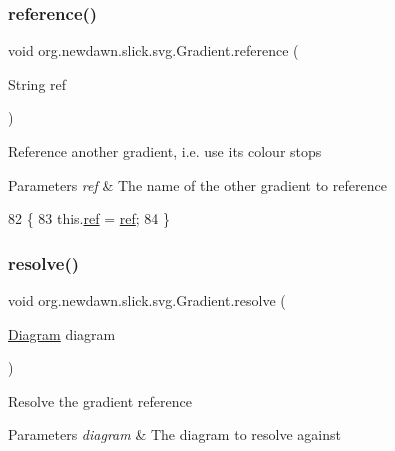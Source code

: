 \subsubsection{\texorpdfstring{reference()}{reference()}}
{\footnotesize\ttfamily void org.\+newdawn.\+slick.\+svg.\+Gradient.\+reference (\begin{DoxyParamCaption}\item[{String}]{ref }\end{DoxyParamCaption})\hspace{0.3cm}{\ttfamily [inline]}}

Reference another gradient, i.\+e. use it\textquotesingle{}s colour stops


\begin{DoxyParams}{Parameters}
{\em ref} & The name of the other gradient to reference \\
\hline
\end{DoxyParams}

\begin{DoxyCode}
82                                       \{
83         this.\mbox{\hyperlink{classorg_1_1newdawn_1_1slick_1_1svg_1_1_gradient_af0df4455cb66dc48f4bcef9c24b3f886}{ref}} = \mbox{\hyperlink{classorg_1_1newdawn_1_1slick_1_1svg_1_1_gradient_af0df4455cb66dc48f4bcef9c24b3f886}{ref}};
84     \}
\end{DoxyCode}
\mbox{\label{classorg_1_1newdawn_1_1slick_1_1svg_1_1_gradient_a1faf4be8592a1ed4af07685f36e3dc1e}} 
\subsubsection{\texorpdfstring{resolve()}{resolve()}}
{\footnotesize\ttfamily void org.\+newdawn.\+slick.\+svg.\+Gradient.\+resolve (\begin{DoxyParamCaption}\item[{\mbox{\hyperlink{classorg_1_1newdawn_1_1slick_1_1svg_1_1_diagram}{Diagram}}}]{diagram }\end{DoxyParamCaption})\hspace{0.3cm}{\ttfamily [inline]}}

Resolve the gradient reference


\begin{DoxyParams}{Parameters}
{\em diagram} & The diagram to resolve against \\
\hline
\end{DoxyParams}

